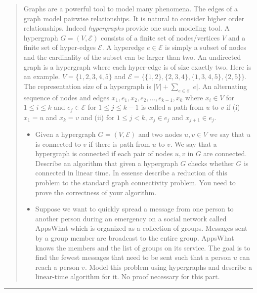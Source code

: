 \documentclass[11pt]{article}
\begin{document}



\begin{quote}
Graphs are a powerful tool to model many phenomena.  The edges
  of a graph model pairwise relationships. It is natural to consider
  higher order relationships.  Indeed {\em hypergraphs} provide one
  such modeling tool.  A hypergraph $G=(V,\mathcal{E})$ consists of a
  finite set of nodes/vertices $V$ and a finite set of hyper-edges
  $\mathcal{E}$. A hyperedge $e \in \mathcal{E}$ is simply a subset of
  nodes and the cardinality of the subset can be larger than two. An
  undirected graph is a hypergraph where each hyper-edge is of size
  exactly two. Here is an example. $V=\{1,2,3,4,5\}$ and $\mathcal{E}
  = \{\{1,2\},\{2,3,4\},\{1,3,4,5\},\{2,5\}\}$. The representation
  size of a hypergraph is $|V| + \sum_{e \in \mathcal{E}} |e|$.  An
  alternating sequence of nodes and edges
  $x_1,e_1,x_2,e_2,\ldots,e_{k-1},x_k$ where $x_i \in V$ for $1 \le i
  \le k$ and $e_j \in \mathcal{E}$ for $1 \le j \le k-1$ is called a
  path from $u$ to $v$ if (i) $x_1 = u$ and $x_k = v$ and (ii) for $1
  \le j < k$, $x_j \in e_j$ and $x_{j+1} \in e_j$.

  \begin{itemize}
  \item Given a hypergraph $G=(V,\mathcal{E})$ and two nodes $u,v \in V$
    we say that $u$ is connected to $v$ if there is path from $u$ to $v$.
    We say that a hypergraph is connected
    if each pair of nodes $u,v$ in $G$ are connected. Describe an algorithm that
    given a hypergraph $G$ checks whether $G$ is connected in linear time.
    In essense describe a reduction of this problem to the standard graph
    connectivity problem. You need to prove the correctness of your algorithm.
  \item Suppose we want to quickly spread a message from one person to
    another person during an emergency on a social network called
    AppsWhat which is organized as a collection of groups. Messages
    sent by a group member are broadcast to the entire group. AppsWhat
    knows the members and the list of groups on its service. The goal
    is to find the fewest messages that need to be sent such that a
    person $u$ can reach a person $v$. Model this problem using
    hypergraphs and describe a linear-time algorithm for it.
    No proof necessary for this part.
  \end{itemize}
\end{quote}
\hrule
\end{document}

